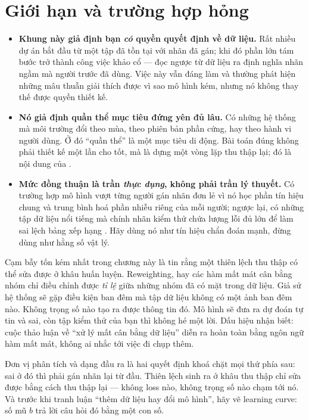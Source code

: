 \documentclass[../../deep_learning.tex]{subfiles}
\begin{document}
\section{Giới hạn và trường hợp hỏng}

\begin{itemize}
\item \textbf{Khung này giả định bạn \emph{có} quyền quyết định về dữ liệu.} Rất nhiều dự án bắt đầu từ một tập đã tồn tại với nhãn đã gán; khi đó phần lớn tám bước trở thành công việc khảo cổ --- đọc ngược từ dữ liệu ra định nghĩa nhãn ngầm mà người trước đã dùng. Việc này vẫn đáng làm và thường phát hiện những mâu thuẫn giải thích được vì sao mô hình kém, nhưng nó không thay thế được quyền thiết kế.
\item \textbf{Nó giả định quần thể mục tiêu đứng yên đủ lâu.} Có những hệ thống mà môi trường đổi theo mùa, theo phiên bản phần cứng, hay theo hành vi người dùng. Ở đó ``quần thể'' là một mục tiêu di động. Bài toán đúng không phải thiết kế một lần cho tốt, mà là dựng một vòng lặp thu thập lại; đó là nội dung của .
\item \textbf{Mức đồng thuận là trần \emph{thực dụng}, không phải trần lý thuyết.} Có trường hợp mô hình vượt từng người gán nhãn đơn lẻ vì nó học phần tín hiệu chung và trung bình hoá phần nhiễu riêng của mỗi người; ngược lại, có những tập dữ liệu nổi tiếng mà chính nhãn kiểm thử chứa lượng lỗi đủ lớn để làm sai lệch bảng xếp hạng \cite{northcutt2021pervasive}. Hãy dùng nó như tín hiệu chẩn đoán mạnh, đừng dùng như hằng số vật lý.
\end{itemize}

\begin{cambay}
Cạm bẫy tốn kém nhất trong chương này là tin rằng một thiên lệch thu thập có thể sửa được ở khâu huấn luyện. Reweighting,  hay các hàm mất mát cân bằng nhóm chỉ điều chỉnh được \emph{tỉ lệ} giữa những nhóm đã có mặt trong dữ liệu. Giả sử hệ thống sẽ gặp điều kiện ban đêm mà tập dữ liệu không có một ảnh ban đêm nào. Không trọng số nào tạo ra được thông tin đó. Mô hình sẽ đưa ra dự đoán tự tin và sai, còn tập kiểm thử của bạn thì không hé một lời. Dấu hiệu nhận biết: cuộc thảo luận về ``xử lý mất cân bằng dữ liệu'' diễn ra hoàn toàn bằng ngôn ngữ hàm mất mát, không ai nhắc tới việc đi chụp thêm.
\end{cambay}

\begin{cannho}
Đơn vị phân tích và dạng đầu ra là hai quyết định khoá chặt mọi thứ phía sau: sai ở đó thì phải gán nhãn lại từ đầu. Thiên lệch sinh ra ở khâu thu thập chỉ sửa được bằng cách thu thập lại --- không loss nào, không trọng số nào chạm tới nó. Và trước khi tranh luận ``thêm dữ liệu hay đổi mô hình'', hãy vẽ learning curve: số mũ \(b\) trả lời câu hỏi đó bằng một con số. 
\end{cannho}
\end{document}
